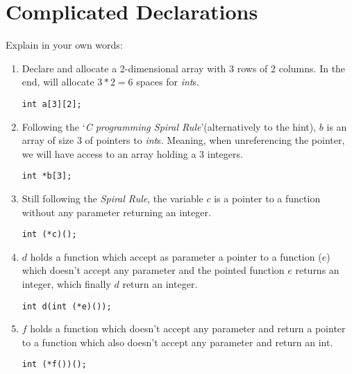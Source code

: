 %
%
\section{Complicated Declarations}

Explain in your own words:

\begin{enumerate}
    \item Declare and allocate a 2-dimensional array with 3 rows of 2 columns. In the end, will allocate $3*2 = 6$ spaces for \emph{int}s.
    \begin{lstlisting}
int a[3][2];
    \end{lstlisting}

    \item Following the `\emph{C programming Spiral Rule}'(alternatively to the hint), $b$ is an array of size 3 of pointers to \emph{int}s. Meaning, when unreferencing the pointer, we will have access to an array holding a 3 integers.
    \begin{lstlisting}
int *b[3];
    \end{lstlisting}

    \item Still following the \emph{Spiral Rule}\footnotemark[1], the variable $c$ is a pointer to a function without any parameter returning an integer.
    \begin{lstlisting}
int (*c)();
    \end{lstlisting}

    \item $d$ holds a function which accept as parameter a pointer to a function ($e$) which doesn't accept any parameter and the pointed function $e$ returns an integer, which finally $d$ return an integer.
    \begin{lstlisting}
int d(int (*e)());
    \end{lstlisting}

    \item $f$ holds a function which doesn't accept any parameter and return a pointer to a function which also doesn't accept any parameter and return an int.
    \begin{lstlisting}
int (*f())();
    \end{lstlisting}
\end{enumerate}

%
%
